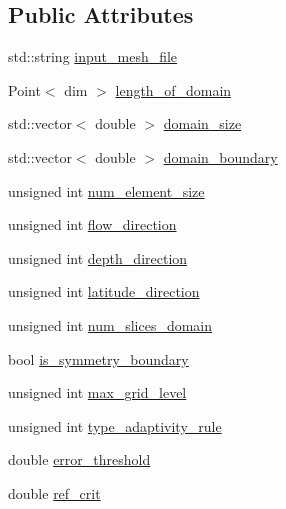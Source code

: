 \subsection*{Public Attributes}
\begin{DoxyCompactItemize}
\item 
std\+::string \hyperlink{struct_u_b_c__mis__mixing_1_1_parameters_aac252c8e13f3b044975af28070f2f756}{input\+\_\+mesh\+\_\+file}
\item 
Point$<$ dim $>$ \hyperlink{struct_u_b_c__mis__mixing_1_1_parameters_a24a6cf602ba017ad9f6504fb0ac083dd}{length\+\_\+of\+\_\+domain}
\item 
std\+::vector$<$ double $>$ \hyperlink{struct_u_b_c__mis__mixing_1_1_parameters_afb1287d7ff99313c1810618d9ba3e88d}{domain\+\_\+size}
\item 
std\+::vector$<$ double $>$ \hyperlink{struct_u_b_c__mis__mixing_1_1_parameters_ab5dd18f3f93bdac91f6d9ac765f7b0f2}{domain\+\_\+boundary}
\item 
unsigned int \hyperlink{struct_u_b_c__mis__mixing_1_1_parameters_a165c8e3abf1f41603587816b9016c612}{num\+\_\+element\+\_\+size}
\item 
unsigned int \hyperlink{struct_u_b_c__mis__mixing_1_1_parameters_a5a6ccb735b9c9aa71b1a9f85fc255315}{flow\+\_\+direction}
\item 
unsigned int \hyperlink{struct_u_b_c__mis__mixing_1_1_parameters_abaad9269bbf285086d40e5d8c3a6bbdd}{depth\+\_\+direction}
\item 
unsigned int \hyperlink{struct_u_b_c__mis__mixing_1_1_parameters_a1fb7274b6cc0e9ae893a3eab78c1e570}{latitude\+\_\+direction}
\item 
unsigned int \hyperlink{struct_u_b_c__mis__mixing_1_1_parameters_a3255a2145157e46b3d14e3eb39e4e518}{num\+\_\+slices\+\_\+domain}
\item 
bool \hyperlink{struct_u_b_c__mis__mixing_1_1_parameters_a4a1b3e4a709cf64c32d76435c2b090ac}{is\+\_\+symmetry\+\_\+boundary}
\item 
unsigned int \hyperlink{struct_u_b_c__mis__mixing_1_1_parameters_ae62b04744b770122b229fcabe1507274}{max\+\_\+grid\+\_\+level}
\item 
unsigned int \hyperlink{struct_u_b_c__mis__mixing_1_1_parameters_acace64be0270631ad440144d231187b0}{type\+\_\+adaptivity\+\_\+rule}
\item 
double \hyperlink{struct_u_b_c__mis__mixing_1_1_parameters_a13ee78e31e67b8d1f2cdc298e55fcad9}{error\+\_\+threshold}
\item 
double \hyperlink{struct_u_b_c__mis__mixing_1_1_parameters_a1cb12452f4e62d63463960a293b6fcfe}{ref\+\_\+crit}

\end{DoxyCompactItemize}
